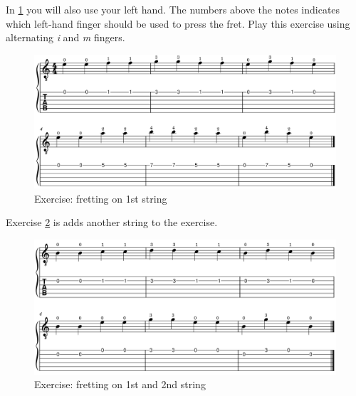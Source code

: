 \newpage

In \ref{fig:exercise_fretting_fingering_first_string} you will also use your left hand. The numbers above the notes indicates which left-hand finger should be used to press the fret. Play this exercise using alternating \textit{i} and \textit{m} fingers. 

\begin{figure}[h]
    \centering
    \includegraphics[width=\textwidth]{../MuseScore/Guitar/FirstStringFingers.png}
    \caption{Exercise: fretting on 1st string}
    \label{fig:exercise_fretting_fingering_first_string}
\end{figure}

Exercise \ref{fig:exercise_fretting_fingering_first_and_second_string} is adds another string to the exercise.

\begin{figure}[h]
	\centering
	\includegraphics[width=\textwidth]{../MuseScore/Guitar/FirstAndSecondStringFingers.png}
	\caption{Exercise: fretting on 1st and 2nd string}
	\label{fig:exercise_fretting_fingering_first_and_second_string}
\end{figure}